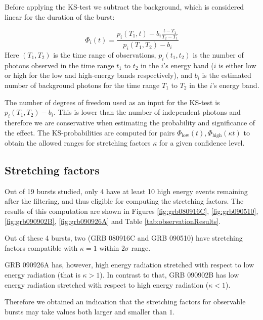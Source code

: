 \documentclass{article}
\begin{document}
Before applying the KS-test we subtract the background, which is
considered linear for the duration of the burst:

\begin{equation}
	\Phi_i\left(t\right) = \frac{p_i\left(T_1, t\right) - b_i \frac{t-T_1}{T_2-T_1}}{p_i\left(T_1, T_2\right) - b_i}
\end{equation}
Here $\left(T_1, T_2\right)$ is the time range of observations,
$p_i\left(t_1, t_2\right)$ is the number of photons observed in the
time range $t_1$ to $t_2$ in the $i$'s energy band ($i$ is either low
or high for the low and high-energy bands respectively), and $b_i$ is
the estimated number of background photons for the time range $T_1$ to
$T_2$ in the $i$'s energy band.

The number of degrees of freedom used as an input for the KS-test is
$p_i\left(T_1, T_2\right) - b_i$. This is lower than the number of
independent photons and therefore we are conservative when estimating
the probability and significance of the effect. The KS-probabilities
are computed for pairs $\Phi_\text{low}\left(t\right),
\Phi_\text{high}\left(\kappa t\right)$ to obtain the allowed ranges
for stretching factors $\kappa$ for a given confidence level.

\subsection{Stretching factors}

Out of 19 bursts studied, only 4 have at least 10 high energy events
remaining after the filtering, and thus eligible for computing the
stretching factors. The results of this computation are shown in
Figures \ref{fig:grb080916C}, \ref{fig:grb090510},
\ref{fig:grb090902B}, \ref{fig:grb090926A} and Table
\ref{tab:observationResults}.

Out of these 4 bursts, two (GRB 080916C and GRB 090510) have
stretching factors compatible with $\kappa = 1$ within $2\sigma$
range.

GRB 090926A has, however, high energy radiation stretched with respect
to low energy radiation (that is $\kappa > 1$). In contrast to that,
GRB 090902B has low energy radiation stretched with respect to high
energy radiation ($\kappa < 1$).

Therefore we obtained an indication that the stretching factors for
observable bursts may take values both larger and smaller than $1$.
\end{document}
